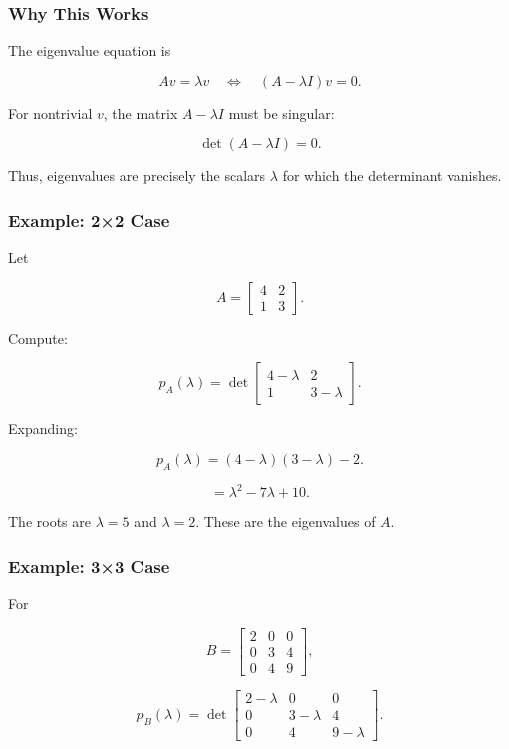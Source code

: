 \documentclass[
  letterpaper,
  DIV=11,
  numbers=noendperiod]{scrreprt}
\begin{document}
\subsubsection{Why This Works}\label{why-this-works-1}

The eigenvalue equation is

\[
Av = \lambda v \quad \iff \quad (A - \lambda I)v = 0.
\]

For nontrivial \(v\), the matrix \(A - \lambda I\) must be singular:

\[
\det(A - \lambda I) = 0.
\]

Thus, eigenvalues are precisely the scalars \(\lambda\) for which the
determinant vanishes.

\subsubsection{Example: 2×2 Case}\label{example-22-case-3}

Let

\[
A = \begin{bmatrix} 4 & 2 \\ 1 & 3 \end{bmatrix}.
\]

Compute:

\[
p_A(\lambda) = \det \begin{bmatrix} 4-\lambda & 2 \\ 1 & 3-\lambda \end{bmatrix}.
\]

Expanding:

\[
p_A(\lambda) = (4-\lambda)(3-\lambda) - 2.
\]

\[
= \lambda^2 - 7\lambda + 10.
\]

The roots are \(\lambda = 5\) and \(\lambda = 2\). These are the
eigenvalues of \(A\).

\subsubsection{Example: 3×3 Case}\label{example-33-case-3}

For

\[
B = \begin{bmatrix} 2 & 0 & 0 \\ 0 & 3 & 4 \\ 0 & 4 & 9 \end{bmatrix},
\]

\[
p_B(\lambda) = \det \begin{bmatrix} 2-\lambda & 0 & 0 \\ 0 & 3-\lambda & 4 \\ 0 & 4 & 9-\lambda \end{bmatrix}.
\]
\end{document}

